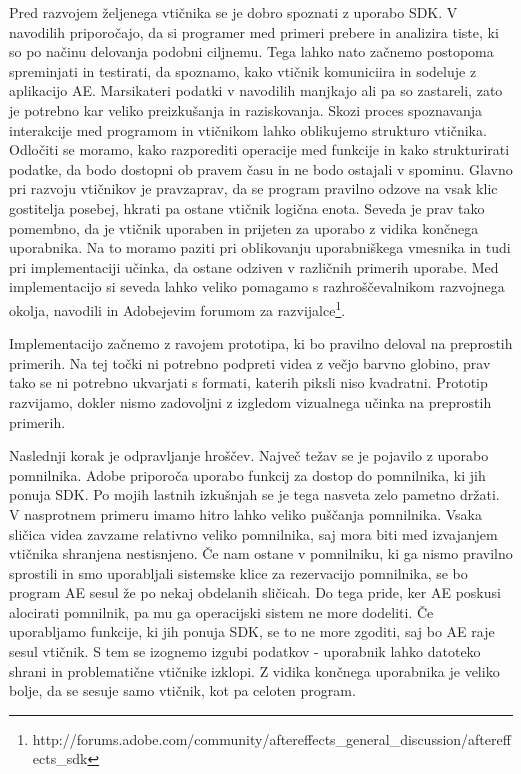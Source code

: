 \documentclass[a4paper, 12pt]{book}
\begin{document}
Pred razvojem željenega vtičnika se je dobro spoznati z uporabo SDK. 
V navodilih priporočajo, da si programer med primeri prebere in analizira tiste, ki so po načinu delovanja podobni ciljnemu\cite{aesdk}. 
Tega lahko nato začnemo postopoma spreminjati in testirati, da spoznamo, kako vtičnik komuniciira in sodeluje z aplikacijo AE.
Marsikateri podatki v navodilih manjkajo ali pa so zastareli, zato je potrebno kar veliko preizkušanja in raziskovanja.  
Skozi proces spoznavanja interakcije med programom in vtičnikom lahko oblikujemo strukturo vtičnika. 
Odločiti se moramo, kako razporediti operacije med funkcije in kako  strukturirati podatke, da bodo dostopni ob pravem času in ne bodo ostajali v spominu. 
Glavno pri razvoju vtičnikov je pravzaprav, da se program pravilno odzove na vsak klic gostitelja posebej, hkrati pa ostane vtičnik logična enota.
Seveda je prav tako pomembno, da je vtičnik uporaben in prijeten za uporabo z vidika končnega uporabnika.
Na to moramo paziti pri oblikovanju uporabniškega vmesnika in tudi pri implementaciji učinka, da ostane odziven v različnih primerih uporabe.
Med implementacijo si seveda lahko veliko pomagamo s razhroščevalnikom razvojnega okolja, navodili in Adobejevim forumom za razvijalce\footnote{http://forums.adobe.com/community/aftereffects\_general\_discussion/aftereffects\_sdk}.

Implementacijo začnemo z ravojem prototipa, ki bo pravilno deloval na preprostih primerih.
Na tej točki ni potrebno podpreti videa z večjo barvno globino, prav tako se ni potrebno ukvarjati s formati, katerih piksli niso kvadratni.
Prototip razvijamo, dokler nismo zadovoljni z izgledom vizualnega učinka na preprostih primerih.

Naslednji korak je odpravljanje hroščev.
Največ težav se je pojavilo z uporabo pomnilnika.
Adobe priporoča uporabo funkcij za dostop do pomnilnika, ki jih ponuja SDK.
Po mojih lastnih izkušnjah se je tega nasveta zelo pametno držati.
V nasprotnem primeru imamo hitro lahko veliko puščanja pomnilnika.
Vsaka sličica videa zavzame relativno veliko pomnilnika, saj mora biti med izvajanjem vtičnika shranjena nestisnjeno.
Če nam ostane v pomnilniku, ki ga nismo pravilno sprostili in smo uporabljali sistemske klice za rezervacijo pomnilnika, se bo program AE sesul že po nekaj obdelanih sličicah.
Do tega pride, ker AE poskusi alocirati pomnilnik, pa mu ga operacijski sistem ne more dodeliti. 
Če uporabljamo funkcije, ki jih ponuja SDK, se to ne more zgoditi, saj bo AE raje sesul vtičnik.
S tem se izognemo izgubi podatkov - uporabnik lahko datoteko shrani in problematične vtičnike izklopi.
Z vidika končnega uporabnika je veliko bolje, da se sesuje samo vtičnik, kot pa celoten program.
\end{document}

